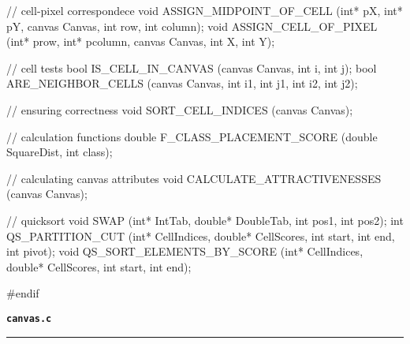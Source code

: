 \begin{C}
// cell-pixel correspondece
void ASSIGN_MIDPOINT_OF_CELL (int* pX, int* pY, canvas Canvas, int row, int column);
void ASSIGN_CELL_OF_PIXEL (int* prow, int* pcolumn, canvas Canvas, int X, int Y);

// cell tests
bool IS_CELL_IN_CANVAS (canvas Canvas, int i, int j);
bool ARE_NEIGHBOR_CELLS (canvas Canvas, int i1, int j1, int i2, int j2);

// ensuring correctness
void SORT_CELL_INDICES (canvas Canvas);

// calculation functions
double F_CLASS_PLACEMENT_SCORE (double SquareDist, int class);

// calculating canvas attributes
void CALCULATE_ATTRACTIVENESSES (canvas Canvas);

// quicksort
void SWAP (int* IntTab, double* DoubleTab, int pos1, int pos2);
int QS_PARTITION_CUT (int* CellIndices, double* CellScores, int start, int end, int pivot);
void QS_SORT_ELEMENTS_BY_SCORE (int* CellIndices, double* CellScores, int start, int end);


#endif
\end{C}
\vspace*{5mm}
{\Large \texttt{\textbf{canvas.c}}}
\vspace*{1mm}
\hrule
